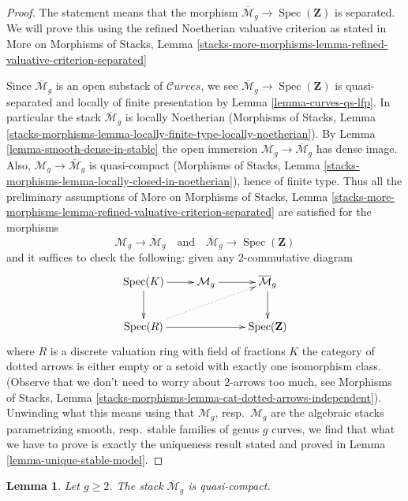 \documentclass{stacks-project}
\theoremstyle{plain}
\newtheorem{lemma}[subsection]{Lemma}
\theoremstyle{definition}
\theoremstyle{remark}
\numberwithin{equation}{subsection}
\def\Spec{\mathop{\mathrm{Spec}}}
\def\Curvesstack{\mathcal{C}\!\mathit{urves}}
\begin{document}
\begin{proof}
The statement means that the morphism
$\overline{\mathcal{M}}_g \to \Spec(\mathbf{Z})$ is separated.
We will prove this using the refined Noetherian valuative criterion
as stated in 
More on Morphisms of Stacks, Lemma
\ref{stacks-more-morphisms-lemma-refined-valuative-criterion-separated}

\medskip\noindent
Since $\overline{\mathcal{M}}_g$ is an open substack of
$\Curvesstack$, we see $\overline{\mathcal{M}}_g \to \Spec(\mathbf{Z})$
is quasi-separated and
locally of finite presentation by Lemma \ref{lemma-curves-qs-lfp}.
In particular the stack $\overline{\mathcal{M}}_g$ is locally
Noetherian (Morphisms of Stacks, Lemma
\ref{stacks-morphisms-lemma-locally-finite-type-locally-noetherian}).
By Lemma \ref{lemma-smooth-dense-in-stable} the open immersion
$\mathcal{M}_g \to \overline{\mathcal{M}}_g$
has dense image. Also, $\mathcal{M}_g \to \overline{\mathcal{M}}_g$
is quasi-compact (Morphisms of Stacks, Lemma
\ref{stacks-morphisms-lemma-locally-closed-in-noetherian}),
hence of finite type. Thus all the preliminary assumptions
of More on Morphisms of Stacks, Lemma
\ref{stacks-more-morphisms-lemma-refined-valuative-criterion-separated}
are satisfied for the morphisms
$$
\mathcal{M}_g \to \overline{\mathcal{M}}_g
\quad\text{and}\quad
\overline{\mathcal{M}}_g \to \Spec(\mathbf{Z})
$$
and it suffices to check the following: given any $2$-commutative diagram
$$
\xymatrix{
\Spec(K) \ar[r] \ar[d] &
\mathcal{M}_g \ar[r] &
\overline{\mathcal{M}}_g \ar[d] \\
\Spec(R) \ar[rr] \ar@{..>}[rru] & & \Spec(\mathbf{Z})
}
$$
where $R$ is a discrete valuation ring with field of fractions $K$
the category of dotted arrows is either empty or a setoid with exactly
one isomorphism class. (Observe that we don't need to worry about
$2$-arrows too much, see Morphisms of Stacks, Lemma
\ref{stacks-morphisms-lemma-cat-dotted-arrows-independent}).
Unwinding what this means using that
$\mathcal{M}_g$, resp.\ $\overline{\mathcal{M}}_g$ are
the algebraic stacks parametrizing smooth, resp.\ stable families
of genus $g$ curves, we find that what we have to prove
is exactly the uniqueness result stated and proved in
Lemma \ref{lemma-unique-stable-model}.
\end{proof}

\begin{lemma}
\label{lemma-stable-quasi-compact}
Let $g \geq 2$. The stack $\overline{\mathcal{M}}_g$ is quasi-compact.
\end{lemma}
\end{document}
